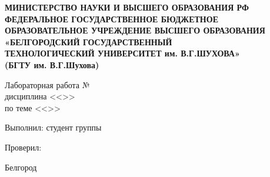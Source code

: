 \begin{titlepage}
\thispagestyle{empty}
\setlength{\parindent}{0ex} %

\begin{center}
  \textbf{МИНИСТЕРСТВО НАУКИ И ВЫСШЕГО ОБРАЗОВАНИЯ РФ\\
ФЕДЕРАЛЬНОЕ ГОСУДАРСТВЕННОЕ БЮДЖЕТНОЕ ОБРАЗОВАТЕЛЬНОЕ УЧРЕЖДЕНИЕ
ВЫСШЕГО ОБРАЗОВАНИЯ\\
«БЕЛГОРОДСКИЙ ГОСУДАРСТВЕННЫЙ\\
ТЕХНОЛОГИЧЕСКИЙ УНИВЕРСИТЕТ им. В.Г.ШУХОВА»\\
(БГТУ им. В.Г.Шухова)
}
\end{center}

\vspace{50mm}

\begin{center}
  Лабораторная работа № \LabNum \\
  дисциплина <<\LabSubject>>\\
  по теме <<\LabTheme>>\\
\end{center}

\vspace{40mm}

\begin{minipage}{.60\linewidth}
    Выполнил: студент группы \Group

    \smallskip

    Проверил:
\end{minipage}
\hfill
\begin{minipage}{.4\linewidth}
  \begin{flushright}
    \AuthorFIO

    \smallskip

    \LecturerFIO
  \end{flushright}
\end{minipage}

\vfill
\begin{center}
  Белгород \Year
\end{center}

\setlength{\parindent}{1.25cm} %
\end{titlepage}